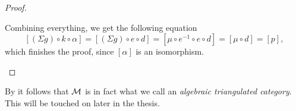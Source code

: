 \begin{proof}
\begin{enumerate}[label={(\bfseries TR\arabic*)}]
{            Combining everything, we get the following equation
            \[
                [(\Sigma g) \circ k \circ \alpha] = [(\Sigma g) \circ e \circ d] =[\mu \circ e^{-1} \circ e \circ d] = [\mu \circ d] = [p],
            \]
            which finishes the proof, since \( [\alpha] \) is an isomorphism.
        }
    \end{enumerate}
\end{proof}

By \cite[Lemma, Subsection 7.5]{Krause_2007} it follows that \( {\mathcal{M}} \) is in fact what we call an \emph{algebraic triangulated category}. This will be touched on later in the thesis. %